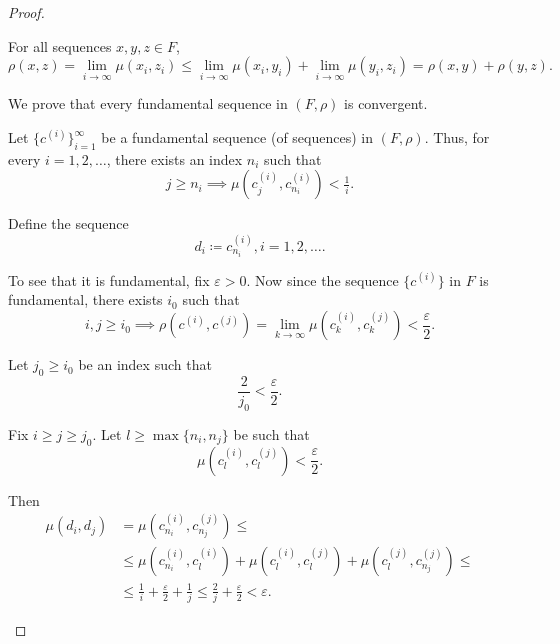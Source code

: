 \begin{proof}
\begin{defenum}
\begin{description}
       For all sequences \( x, y, z \in F \),
      \begin{equation*}
        \rho(x, z) = \lim_{i \to \infty} \mu(x_i, z_i) \leq \lim_{i \to \infty} \mu(x_i, y_i) + \lim_{i \to \infty} \mu(y_i, z_i) = \rho(x, y) + \rho(y, z).
      \end{equation*}
    \end{description}

     We prove that every fundamental sequence in \( (F, \rho) \) is convergent.

    Let \( \{ c^{(i)} \}_{i=1}^\infty \) be a fundamental sequence (of sequences) in \( (F, \rho) \). Thus, for every \( i = 1, 2, \ldots \), there exists an index \( n_i \) such that
    \begin{equation*}
      j \geq n_i \implies \mu(c_j^{(i)}, c_{n_i}^{(i)}) < \tfrac 1 i.
    \end{equation*}

    Define the sequence
    \begin{equation*}
      d_i \coloneqq c_{n_i}^{(i)}, i = 1, 2, \ldots.
    \end{equation*}

    To see that it is fundamental, fix \( \varepsilon > 0 \). Now since the sequence \( \{ c^{(i)} \} \) in \( F \) is fundamental, there exists \( i_0 \) such that
    \begin{equation*}
      i, j \geq i_0 \implies \rho(c^{(i)}, c^{(j)}) = \lim_{k \to \infty} \mu(c_k^{(i)}, c_k^{(j)}) < \frac \varepsilon 2.
    \end{equation*}

    Let \( j_0 \geq i_0 \) be an index such that
    \begin{equation*}
      \frac 2 {j_0} < \frac \varepsilon 2.
    \end{equation*}

    Fix \( i \geq j \geq j_0 \). Let \( l \geq \max \{ n_i, n_j \} \) be such that
    \begin{equation*}
      \mu(c_l^{(i)}, c_l^{(j)}) < \frac \varepsilon 2.
    \end{equation*}

    Then
    \begin{align*}
      \mu(d_i, d_j)
      &=
      \mu(c_{n_i}^{(i)}, c_{n_j}^{(j)})
      \leq \\ &\leq
      \mu(c_{n_i}^{(i)}, c_l^{(i)}) + \mu(c_l^{(i)}, c_l^{(j)}) + \mu(c_l^{(j)}, c_{n_j}^{(j)})
      \leq \\ &\leq
      \frac 1 i + \frac \varepsilon 2 + \frac 1 j
      \leq
      \frac 2 j + \frac \varepsilon 2
      <
      \varepsilon.
    \end{align*}


\end{defenum}
\end{proof}
